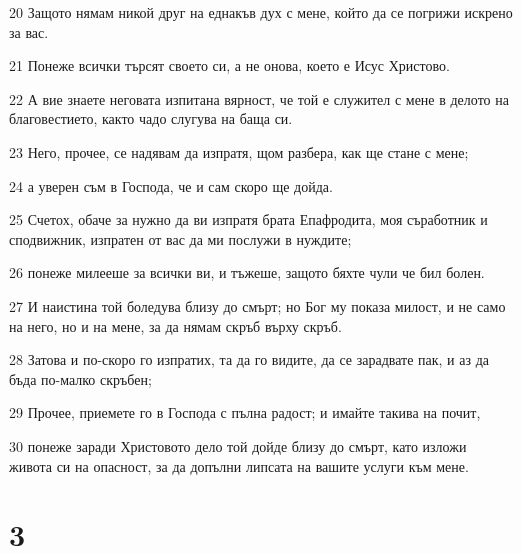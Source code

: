 \par 20 Защото нямам никой друг на еднакъв дух с мене, който да се погрижи искрено за вас.
\par 21 Понеже всички търсят своето си, а не онова, което е Исус Христово.
\par 22 А вие знаете неговата изпитана вярност, че той е служител с мене в делото на благовестието, както чадо слугува на баща си.
\par 23 Него, прочее, се надявам да изпратя, щом разбера, как ще стане с мене;
\par 24 а уверен съм в Господа, че и сам скоро ще дойда.
\par 25 Счетох, обаче за нужно да ви изпратя брата Епафродита, моя съработник и сподвижник, изпратен от вас да ми послужи в нуждите;
\par 26 понеже милееше за всички ви, и тъжеше, защото бяхте чули че бил болен.
\par 27 И наистина той боледува близу до смърт; но Бог му показа милост, и не само на него, но и на мене, за да нямам скръб върху скръб.
\par 28 Затова и по-скоро го изпратих, та да го видите, да се зарадвате пак, и аз да бъда по-малко скръбен;
\par 29 Прочее, приемете го в Господа с пълна радост; и имайте такива на почит,
\par 30 понеже заради Христовото дело той дойде близу до смърт, като изложи живота си на опасност, за да допълни липсата на вашите услуги към мене.

\chapter{3}

